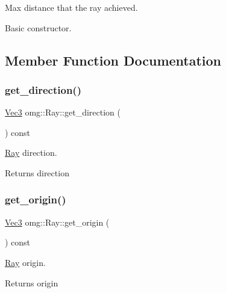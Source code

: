 Max distance that the ray achieved. 

Basic constructor. 

\subsection{Member Function Documentation}
\mbox{\label{classomg_1_1_ray_aed10a92891a426b887927c75018f88b1}} 
\subsubsection{\texorpdfstring{get\_direction()}{get\_direction()}}
{\footnotesize\ttfamily \mbox{\hyperlink{namespaceomg_a45a9482677fee9933ff369b49894e316}{Vec3}} omg\+::\+Ray\+::get\+\_\+direction (\begin{DoxyParamCaption}{ }\end{DoxyParamCaption}) const\hspace{0.3cm}{\ttfamily [inline]}}



\mbox{\hyperlink{classomg_1_1_ray}{Ray}} direction. 

\begin{DoxyReturn}{Returns}
direction 
\end{DoxyReturn}
\mbox{\label{classomg_1_1_ray_a3b2c3ade0173b74f72e7bb4e72363cf3}} 
\subsubsection{\texorpdfstring{get\_origin()}{get\_origin()}}
{\footnotesize\ttfamily \mbox{\hyperlink{namespaceomg_a45a9482677fee9933ff369b49894e316}{Vec3}} omg\+::\+Ray\+::get\+\_\+origin (\begin{DoxyParamCaption}{ }\end{DoxyParamCaption}) const\hspace{0.3cm}{\ttfamily [inline]}}



\mbox{\hyperlink{classomg_1_1_ray}{Ray}} origin. 

\begin{DoxyReturn}{Returns}
origin 
\end{DoxyReturn}
\mbox{\label{classomg_1_1_ray_a841e085c48864a211faf98e3f529d567}} 
